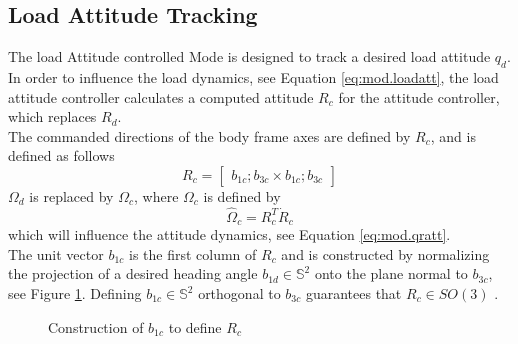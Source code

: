 \subsection{Load Attitude Tracking}\label{sec:con.loadatt}
The load Attitude controlled Mode is designed to track a desired load attitude $ q_d $.
In order to influence the load dynamics, see Equation \ref{eq:mod.loadatt}, the load attitude controller calculates a computed  attitude $ R_c $ for the  attitude controller, which replaces $ R_d $.\\
The commanded directions of the body frame axes are defined by $ R_c $, and is defined as follows
\begin{equation}\label{eq:con.R}
R_c = \begin{bmatrix}
b_{1c}; b_{3c}\times b_{1c};b_{3c}
\end{bmatrix}
\end{equation}
$ \Omega_d $ is replaced by $ \Omega_c $, where $ \Omega_c $ is defined by
\begin{equation}\label{key}
\hat{\Omega}_c=R_c^T\dot{R}_c
\end{equation}
which will influence the  attitude dynamics, see Equation \ref{eq:mod.qratt}.\\
The unit vector $ b_{1c} $ is the first column of $ R_c $ and is constructed by normalizing the projection of a desired heading angle $ b_{1d}\in \mathbb{S}^2 $ onto the plane normal to $ b_{3c} $, see Figure \ref{fig:con.b1c}. Defining $ b_{1c}\in\mathbb{S}^2$ orthogonal to  $ b_{3c}$ guarantees that $ R_c \in SO(3) $ \cite{Lee2010c}.
\begin{figure}[h!]
	\centering
	\caption{Construction of  $ b_{1c} $ to define $ R_c $\label{fig:con.b1c}}
\end{figure}	


